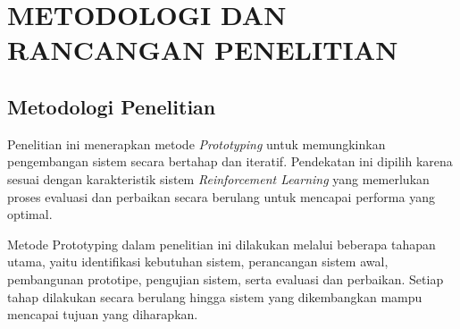 \chapter{METODOLOGI DAN RANCANGAN PENELITIAN}

\section{Metodologi Penelitian}
Penelitian ini menerapkan metode \textit{Prototyping} untuk memungkinkan pengembangan sistem secara bertahap dan iteratif. Pendekatan ini dipilih karena sesuai dengan karakteristik sistem \textit{Reinforcement Learning} yang memerlukan proses evaluasi dan perbaikan secara berulang untuk mencapai performa yang optimal.

Metode Prototyping dalam penelitian ini dilakukan melalui beberapa tahapan utama, yaitu identifikasi kebutuhan sistem, perancangan sistem awal, pembangunan prototipe, pengujian sistem, serta evaluasi dan perbaikan. Setiap tahap dilakukan secara berulang hingga sistem yang dikembangkan mampu mencapai tujuan yang diharapkan.

